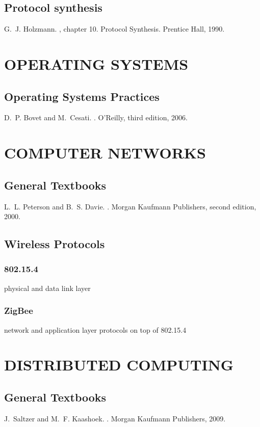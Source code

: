 \documentclass{myproc}
\begin{document}
\subsection{Protocol synthesis}
\bit
\w \textcolor{blue2}{G.~J. Holzmann.
, chapter 10.
  Protocol Synthesis.
\newblock Prentice Hall, 1990.}
\eit


\section{OPERATING SYSTEMS}

\subsection{Operating Systems Practices}
\bit
\w D.~P. Bovet and M.~Cesati.
.
\newblock O'Reilly, third edition, 2006.
\eit

\section{COMPUTER NETWORKS}
\subsection{General Textbooks}
\bit
\w \textcolor{blue2}{L.~L. Peterson and B.~S. Davie.
.
\newblock Morgan Kaufmann Publishers, second edition, 2000.}
\eit

\subsection{Wireless Protocols}
\subsubsection{802.15.4}
\bit
\w physical and data link layer
\eit

\subsubsection{ZigBee}
\bit
\w network and application layer protocols on top of 802.15.4
\eit




\section{DISTRIBUTED COMPUTING}
\subsection{General Textbooks}
\bit
\w J.~Saltzer and M.~F. Kaashoek.
.
\newblock Morgan Kaufmann Publishers, 2009.
\end{document}
